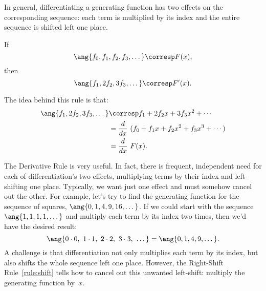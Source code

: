 In general, differentiating a generating function has two effects on
the corresponding sequence: each term is multiplied by its index and
the entire sequence is shifted left one place.

\begin{rul}
\label{rule:derivative}
If
\[
\ang{f_0, f_1, f_2, f_3, \dots} \corresp F(x),
\]
then
%
\[
\ang{f_1, 2f_2, 3f_3, \dots} \corresp F'(x).
\]
\end{rul}

The idea behind this rule is that:
\begin{align*}
\ang{f_1, 2f_2, 3f_3, \dots}
    & \corresp f_1 + 2 f_2 x + 3 f_3 x^2 + \cdots \\
    & = \frac{d}{dx} \ (f_0 + f_1 x + f_2 x^2 + f_3 x^3 + \cdots) \\
    & = \frac{d}{dx} \ F(x).
\end{align*}

The Derivative Rule is very useful.  In fact, there is frequent,
independent need for each of differentiation's two effects,
multiplying terms by their index and left-shifting one place.
Typically, we want just one effect and must somehow cancel out the
other.  For example, let's try to find the generating function for the
sequence of squares, $\ang{0, 1, 4, 9, 16, \dots}$.  If we could
start with the sequence $\ang{1, 1, 1, 1, \dots}$ and multiply each term by
its index two times, then we'd have the desired result:
%
\[
\ang{0 \cdot 0,\ 1 \cdot 1,\ 2 \cdot 2,\ 3 \cdot 3,\ \dots}
=
\ang{0, 1, 4, 9, \dots}.
\]
%
A challenge is that differentiation not only multiplies each term by
its index, but also shifts the whole sequence left one place.
However, the Right-Shift Rule~\ref{rule:shift} tells how to cancel out
this unwanted left-shift: multiply the generating function by~$x$.



